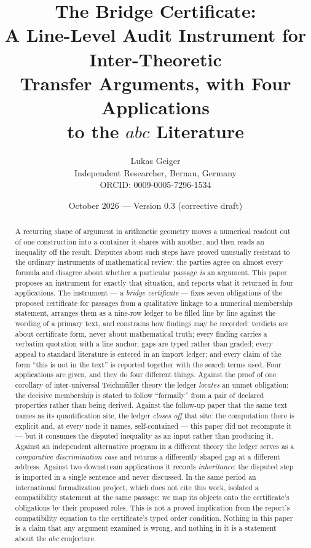 \documentclass[11pt,a4paper]{article}
\title{The Bridge Certificate:\\
A Line-Level Audit Instrument for Inter-Theoretic\\
Transfer Arguments, with Four Applications\\
to the $abc$ Literature}
\author{Lukas Geiger\\[2pt]
\small Independent Researcher, Bernau, Germany\\
\small ORCID: 0009-0005-7296-1534}
\date{October 2026 --- Version 0.3 (corrective draft)}
\theoremstyle{definition}
\begin{document}
\maketitle

\begin{abstract}
\noindent
A recurring shape of argument in arithmetic geometry moves a numerical readout
out of one construction into a container it shares with another, and then reads
an inequality off the result. Disputes about such steps have proved unusually resistant to the ordinary
instruments of mathematical review: the parties agree on almost every formula and
disagree about whether a particular passage \emph{is} an argument. This paper
proposes an instrument for exactly that situation, and reports what it returned
in four applications. The instrument --- a \emph{bridge certificate} --- fixes
seven obligations of the proposed certificate for passages from a qualitative
linkage to a numerical membership statement, arranges them as a nine-row ledger
to be filled line by line against the wording of a primary text, and constrains
how findings may be recorded: verdicts are about certificate form, never about
mathematical truth; every finding carries a verbatim quotation with a line anchor;
gaps are typed rather than graded; every appeal to standard literature is entered
in an import ledger; and every claim of the form ``this is not in the text'' is
reported together with the search terms used. Four applications are given, and
they do four different things. Against the proof of one corollary of
inter-universal Teichmüller theory the ledger \emph{locates} an unmet
obligation: the decisive membership is stated to follow ``formally'' from a pair
of declared properties rather than being derived. Against the follow-up paper
that the same text names as its quantification site, the ledger \emph{closes off}
that site: the computation there is explicit and, at every node it names,
self-contained --- this paper did not recompute it --- but it consumes the disputed
inequality as an input rather than producing it. Against an independent
alternative program in a different theory the ledger serves as a
\emph{comparative discrimination case} and returns a differently shaped gap at a
different address. Against two
downstream applications it records \emph{inheritance}: the disputed step is
imported in a single sentence and never discussed. In the same period an
international formalization project, which does not cite this work, isolated a
compatibility statement at the same passage; we map its
objects onto the certificate's obligations by their proposed roles. This is
not a proved implication from the report's compatibility equation to the
certificate's typed order condition. Nothing in this paper is a claim that any
argument examined is wrong, and nothing in it is a statement about the $abc$
conjecture.
\end{abstract}
\end{document}
